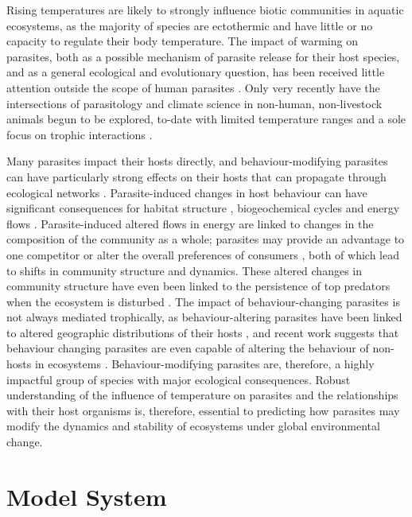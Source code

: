Rising temperatures are likely to strongly influence biotic communities in aquatic ecosystems, as the majority of species are ectothermic and have little or no capacity to regulate their body temperature. The impact of warming on parasites, both as a possible mechanism of parasite release for their host species, and as a general ecological and evolutionary question, has been received little attention outside the scope of human parasites \citep{scott1984,gonzalez2010}. Only very recently have the intersections of parasitology and climate science in non-human, non-livestock animals begun to be explored, to-date with limited temperature ranges \citep{labaude2017} and a sole focus on trophic interactions \citep{laverty2017}. 

Many parasites impact their hosts directly, and behaviour-modifying parasites can have particularly strong effects on their hosts that can propagate through ecological networks \citep{labaude2015host}. Parasite-induced changes in host behaviour can have significant consequences for habitat structure \citep{mouritsen2005}, biogeochemical cycles \citep{vannatta2018} and energy flows \citep{sato2011}. Parasite-induced altered flows in energy are linked to changes in the composition of the community as a whole; parasites may provide an advantage to one competitor \citep{hatcher2014} or alter the overall preferences of consumers \citep{bernot2007,sato2011,bunke2015}, both of which lead to shifts in community structure and dynamics. These altered changes in community structure have even been linked to the persistence of top predators when the ecosystem is disturbed \citep{lefevre2009}. The impact of behaviour-changing parasites is not always mediated trophically, as behaviour-altering parasites have been linked to altered geographic distributions of their hosts \citep{frick2015}, and recent work suggests that behaviour changing parasites are even capable of altering the behaviour of non-hosts in ecosystems \citep{demandt2018}. 
Behaviour-modifying parasites are, therefore, a highly impactful group of species with major ecological consequences. Robust understanding of the influence of temperature on parasites and the relationships with their host organisms is, therefore, essential to predicting how parasites may modify the dynamics and stability of ecosystems under global environmental change. 

\section{Model System}


